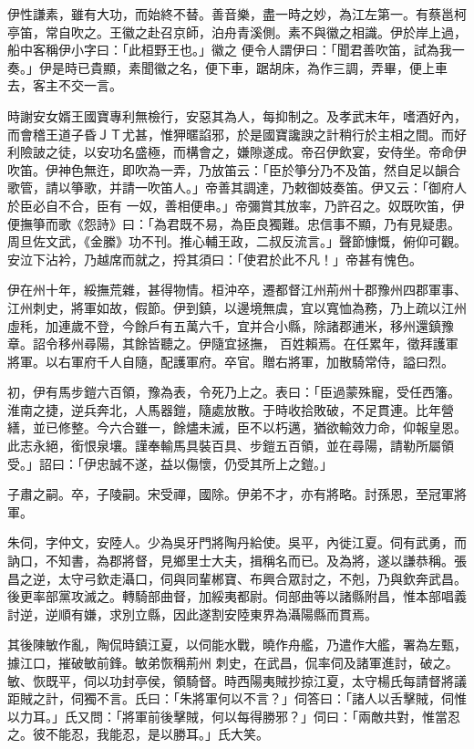 \begin{pinyinscope}
 伊性謙素，雖有大功，而始終不替。善音樂，盡一時之妙，為江左第一。有蔡邕柯亭笛，常自吹之。王徽之赴召京師，泊舟青溪側。素不與徽之相識。伊於岸上過，船中客稱伊小字曰：「此桓野王也。」徽之
 便令人謂伊曰：「聞君善吹笛，試為我一奏。」伊是時已貴顯，素聞徽之名，便下車，踞胡床，為作三調，弄畢，便上車去，客主不交一言。



 時謝安女婿王國寶專利無檢行，安惡其為人，每抑制之。及孝武末年，嗜酒好內，而會稽王道子昏ＪＴ尤甚，惟狎暱諂邪，於是國寶讒諛之計稍行於主相之間。而好利險詖之徒，以安功名盛極，而構會之，嫌隙遂成。帝召伊飲宴，安侍坐。帝命伊吹笛。伊神色無迕，即吹為一弄，乃放笛云：「臣於箏分乃不及笛，然自足以韻合歌管，請以箏歌，并請一吹笛人。」帝善其調達，乃敕御妓奏笛。伊又云：「御府人於臣必自不合，臣有
 一奴，善相便串。」帝彌賞其放率，乃許召之。奴既吹笛，伊便撫箏而歌《怨詩》曰：「為君既不易，為臣良獨難。忠信事不顯，乃有見疑患。周旦佐文武，《金縢》功不刊。推心輔王政，二叔反流言。」聲節慷慨，俯仰可觀。安泣下沾衿，乃越席而就之，捋其須曰：「使君於此不凡！」帝甚有愧色。



 伊在州十年，綏撫荒雜，甚得物情。桓沖卒，遷都督江州荊州十郡豫州四郡軍事、江州刺史，將軍如故，假節。伊到鎮，以邊境無虞，宜以寬恤為務，乃上疏以江州虛秏，加連歲不登，今餘戶有五萬六千，宜并合小縣，除諸郡逋米，移州還鎮豫章。詔令移州尋陽，其餘皆聽之。伊隨宜拯撫，
 百姓賴焉。在任累年，徵拜護軍將軍。以右軍府千人自隨，配護軍府。卒官。贈右將軍，加散騎常侍，謚曰烈。



 初，伊有馬步鎧六百領，豫為表，令死乃上之。表曰：「臣過蒙殊寵，受任西籓。淮南之捷，逆兵奔北，人馬器鎧，隨處放散。于時收拾敗破，不足貫連。比年營繕，並已修整。今六合雖一，餘燼未滅，臣不以朽邁，猶欲輸效力命，仰報皇恩。此志永絕，銜恨泉壤。謹奉輸馬具裝百具、步鎧五百領，並在尋陽，請勒所屬領受。」詔曰：「伊忠誠不遂，益以傷懷，仍受其所上之鎧。」



 子肅之嗣。卒，子陵嗣。宋受禪，國除。伊弟不才，亦有將略。討孫恩，至冠軍將軍。



 朱伺，字仲文，安陸人。少為吳牙門將陶丹給使。吳平，內徙江夏。伺有武勇，而訥口，不知書，為郡將督，見鄉里士大夫，揖稱名而已。及為將，遂以謙恭稱。張昌之逆，太守弓欽走灄口，伺與同輩郴寶、布興合眾討之，不剋，乃與欽奔武昌。後更率部黨攻滅之。轉騎部曲督，加綏夷都尉。伺部曲等以諸縣附昌，惟本部唱義討逆，逆順有嫌，求別立縣，因此遂割安陸東界為灄陽縣而貫焉。



 其後陳敏作亂，陶侃時鎮江夏，以伺能水戰，曉作舟艦，乃遣作大艦，署為左甄，據江口，摧破敏前鋒。敏弟恢稱荊州
 刺史，在武昌，侃率伺及諸軍進討，破之。敏、恢既平，伺以功封亭侯，領騎督。時西陽夷賊抄掠江夏，太守楊氏每請督將議距賊之計，伺獨不言。氏曰：「朱將軍何以不言？」伺答曰：「諸人以舌擊賊，伺惟以力耳。」氏又問：「將軍前後擊賊，何以每得勝邪？」伺曰：「兩敵共對，惟當忍之。彼不能忍，我能忍，是以勝耳。」氏大笑。




\end{pinyinscope}
